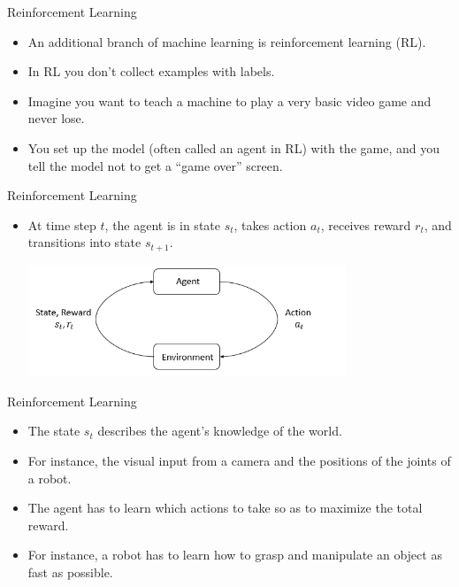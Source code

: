 \documentclass{beamer}
\begin{document}
\begin{frame}{Reinforcement Learning}

\begin{itemize}
\item An additional branch of machine learning is reinforcement learning (RL). 

\item In RL you don't collect examples with labels. 

\item Imagine you want to teach a machine to play a very basic video game and never lose. 

\item You set up the model (often called an agent in RL) with the game, and you tell the model not to get a ``game over'' screen. 
\end{itemize}
\end{frame}

\begin{frame}{Reinforcement Learning}

\begin{itemize}

\item At time step $t$, the agent is in state $s_t$, takes action $a_t$, receives reward $r_t$, and transitions into state $s_{t+1}$.

\bigskip
\includegraphics[width=0.75\textwidth]{images/rl_diagram_transparent_bg.png}
\end{itemize}
\end{frame}


\begin{frame}{Reinforcement Learning}

\begin{itemize}
\item The state $s_t$ describes the agent's knowledge of the world. 

\item For instance, the visual input from a camera and the positions of the joints of a robot.

\item The agent has to learn which actions to take so as to maximize the total reward.  

\item For instance, a robot has to learn how to grasp and manipulate an object as fast as possible.
\end{itemize}

\end{frame}
\end{document}
